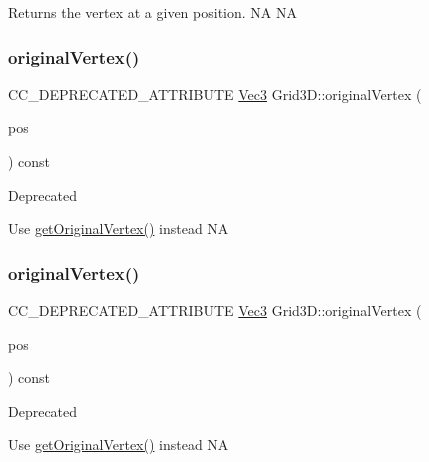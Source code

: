 Returns the vertex at a given position.  NA  NA \mbox{\label{classGrid3D_a2bc02321767e3b79260f11d5c958f750}} 
\subsubsection{\texorpdfstring{original\+Vertex()}{originalVertex()}\hspace{0.1cm}{\footnotesize\ttfamily [1/2]}}
{\footnotesize\ttfamily C\+C\+\_\+\+D\+E\+P\+R\+E\+C\+A\+T\+E\+D\+\_\+\+A\+T\+T\+R\+I\+B\+U\+TE \hyperlink{classVec3}{Vec3} Grid3\+D\+::original\+Vertex (\begin{DoxyParamCaption}\item[{const \hyperlink{classVec2}{Vec2} \&}]{pos }\end{DoxyParamCaption}) const\hspace{0.3cm}{\ttfamily [inline]}}

\begin{DoxyRefDesc}{Deprecated}
\item[\hyperlink{deprecated__deprecated000025}{Deprecated}]Use \hyperlink{classGrid3D_a02428c7bc60ac15aa12448bb63613647}{get\+Original\+Vertex()} instead  NA \end{DoxyRefDesc}
\mbox{\label{classGrid3D_a2bc02321767e3b79260f11d5c958f750}} 
\subsubsection{\texorpdfstring{original\+Vertex()}{originalVertex()}\hspace{0.1cm}{\footnotesize\ttfamily [2/2]}}
{\footnotesize\ttfamily C\+C\+\_\+\+D\+E\+P\+R\+E\+C\+A\+T\+E\+D\+\_\+\+A\+T\+T\+R\+I\+B\+U\+TE \hyperlink{classVec3}{Vec3} Grid3\+D\+::original\+Vertex (\begin{DoxyParamCaption}\item[{const \hyperlink{classVec2}{Vec2} \&}]{pos }\end{DoxyParamCaption}) const\hspace{0.3cm}{\ttfamily [inline]}}

\begin{DoxyRefDesc}{Deprecated}
\item[\hyperlink{deprecated__deprecated000255}{Deprecated}]Use \hyperlink{classGrid3D_a02428c7bc60ac15aa12448bb63613647}{get\+Original\+Vertex()} instead  NA \end{DoxyRefDesc}
\mbox{\label{classGrid3D_ad6c4e2574b5a4104b7bde30bc083ffb7}} 
